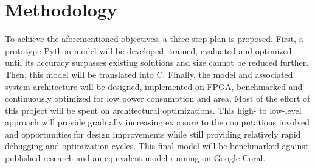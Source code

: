 \documentclass[12pt]{article}
\begin{document}
\section{Methodology}
To achieve the aforementioned objectives, a three-step plan is proposed. First, a prototype Python model will be developed, trained, evaluated and optimized until its accuracy surpasses existing solutions and size cannot be reduced further. Then, this model will be translated into C. Finally, the model and associated system architecture will be designed, implemented on FPGA, benchmarked and continuously optimized for low power consumption and area. Most of the effort of this project will be spent on architectural optimizations. This high- to low-level approach will provide gradually increasing exposure to the computations involved and opportunities for design improvements while still providing relatively rapid debugging and optimization cycles. This final model will be benchmarked against published research and an equivalent model running on Google Coral.

\newpage
\printbibliography
\end{document}
